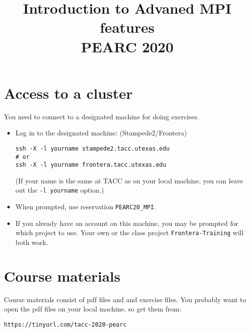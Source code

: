 \documentclass[11pt]{artikel3}
\begin{document}
\title{Introduction to Advaned MPI features\\ PEARC 2020}
\author{}\date{}
\maketitle

\section{Access to a cluster}

You need to connect to a designated machine for doing exercises.

\begin{itemize}
\item Log in to the designated machine: (Stampede2/Frontera)
\begin{verbatim}
ssh -X -l yourname stampede2.tacc.utexas.edu
# or
ssh -X -l yourname frontera.tacc.utexas.edu
\end{verbatim}
(If your name is the same at TACC as on your local machine,
you can leave out the \texttt{-l yourname} option.)
\item When prompted, use reservation
  \texttt{PEARC20\_MPI}.
\item If you already have an account on this machine,
  you may be prompted for which project to use.
  Your own or the class project
  \texttt{Frontera-Training}
  will both work.
\end{itemize}

\section{Course materials}

Course materials consist of pdf files and
and exercise files.
You probably want to open the pdf files
on your local machine, so get them from:
\begin{verbatim}
https://tinyurl.com/tacc-2020-pearc
\end{verbatim}
\end{document}
